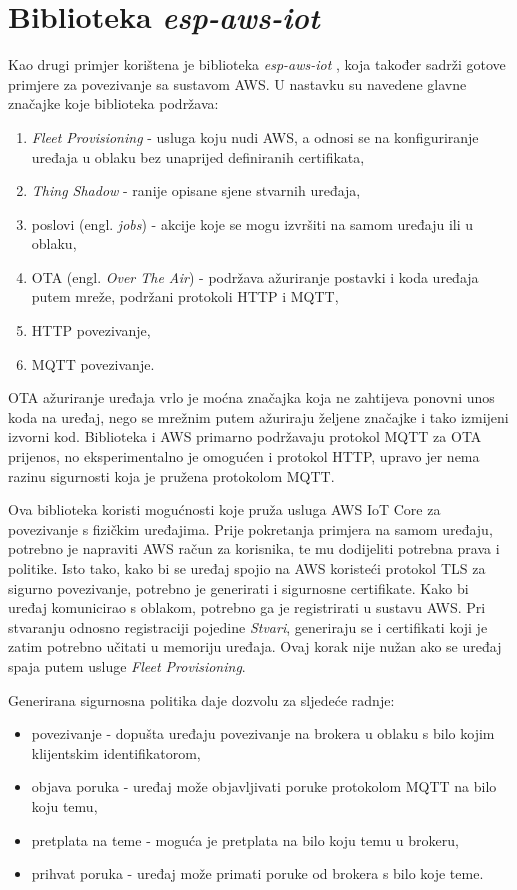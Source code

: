 \section{Biblioteka \textit{esp-aws-iot}} 

Kao drugi primjer korištena je biblioteka \textit{esp-aws-iot} \cite{esp-aws-iot}, koja također sadrži gotove primjere za povezivanje sa sustavom AWS. U nastavku su navedene glavne značajke koje biblioteka podržava:
\begin{enumerate}
	\item \textit{Fleet Provisioning} - usluga koju nudi AWS, a odnosi se na konfiguriranje uređaja u oblaku bez unaprijed definiranih certifikata,
	\item \textit{Thing Shadow} - ranije opisane sjene stvarnih uređaja,
	\item poslovi (engl. \textit{jobs}) - akcije koje se mogu izvršiti na samom uređaju ili u oblaku,
	\item OTA (engl. \textit{Over The Air}) - podržava ažuriranje postavki i koda uređaja putem mreže, podržani protokoli HTTP i MQTT, 
	\item HTTP povezivanje,
	\item MQTT povezivanje.
\end{enumerate}

OTA ažuriranje uređaja vrlo je moćna značajka koja ne zahtijeva ponovni unos koda na uređaj, nego se mrežnim putem ažuriraju željene značajke i tako izmijeni izvorni kod. Biblioteka i AWS primarno podržavaju protokol MQTT za OTA prijenos, no eksperimentalno je omogućen i protokol HTTP, upravo jer nema razinu sigurnosti koja je pružena protokolom MQTT.

Ova biblioteka koristi mogućnosti koje pruža usluga AWS IoT Core za povezivanje s fizičkim uređajima. Prije pokretanja primjera na samom uređaju, potrebno je napraviti AWS račun za korisnika, te mu dodijeliti potrebna prava i politike. Isto tako, kako bi se uređaj spojio na AWS koristeći protokol TLS za sigurno povezivanje, potrebno je generirati i sigurnosne certifikate. Kako bi uređaj komunicirao s oblakom, potrebno ga je registrirati u sustavu AWS. Pri stvaranju odnosno registraciji pojedine \textit{Stvari}, generiraju se i certifikati koji je zatim potrebno učitati u memoriju uređaja. Ovaj korak nije nužan ako se uređaj spaja putem usluge \textit{Fleet Provisioning}. 

Generirana sigurnosna politika daje dozvolu za sljedeće radnje:
\begin{itemize}
	\item povezivanje - dopušta uređaju povezivanje na brokera u oblaku s bilo kojim klijentskim identifikatorom, 
	\item objava poruka - uređaj može objavljivati poruke protokolom MQTT na bilo koju temu,
	\item pretplata na teme - moguća je pretplata na bilo koju temu u brokeru,
	\item prihvat poruka - uređaj može primati poruke od brokera s bilo koje teme.
\end{itemize}

